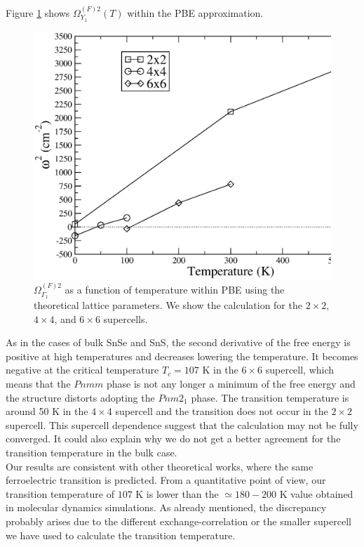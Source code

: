 Figure \ref{freq-transition-mono} shows $\Omega^{(F)2}_{Y_{1}}(T)$ within the PBE approximation.
\begin{figure}[h]
\includegraphics[width=\linewidth]{Figures/freq-mono.eps}
\caption[Phonon collapse in monolayer SnSe.]{$\Omega^{(F)2}_{\Gamma_{1}}$ as a function of temperature within PBE 
using the theoretical lattice parameters. We show the calculation for the $2\times2$, $4\times4$, and $6\times6$ 
supercells.}
\label{freq-transition-mono}
\end{figure}
As in the cases of bulk SnSe and SnS, the second derivative of the free energy is positive at high temperatures and 
decreases lowering the temperature. It becomes negative at the critical temperature 
$T_{c}=107$ K in the $6\times6$ supercell, which means that the $Pnmm$ phase is not any longer a minimum of the free 
energy and the structure distorts adopting the $Pnm2_{1}$ phase. The transition temperature is around 50 K in the 
$4\times4$ supercell and the transition does not occur in the $2\times2$ supercell. This supercell dependence 
suggest that the calculation may not be fully converged. It could also explain why we do not get a better 
agreement for the transition temperature in the bulk case. \\

Our results are consistent with other theoretical 
works\cite{mehboudi2016structural,barraza2018tuning,fei2016ferroelectricity}, where the same ferroelectric 
transition is predicted. From a quantitative point of view, our transition temperature of $107$ K is lower than the 
$\simeq180-200$ K value obtained in molecular dynamics simulations\cite{mehboudi2016structural,barraza2018tuning}. 
As already mentioned, the discrepancy probably arises due to the different exchange-correlation or the smaller 
supercell we have used to calculate the transition temperature.

